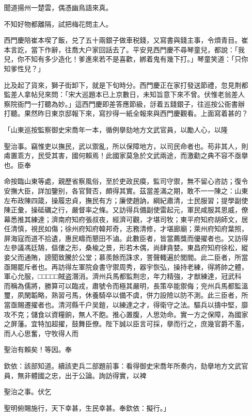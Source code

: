\begin{myquote}
聞道揚州一楚雲，偶憑幽鳥語來真。

不知好物都離隔，試把梅花問主人。
\end{myquote}

西門慶陪崔本喫了飯，兑了五十兩銀子做車税錢，又寫書與錢主事，令煩青目。崔本言訖，當下作辭，往喬大户家回話去了。平安見西門慶不尋琴童兒，都說：「我兒，你不知有多少造化！爹進來若不是喜歡，綁着鬼有幾下打。」琴童笑道：「只你知爹性兒？」

比及起了貨來，獅子街卸下，就是下旬時分。西門慶正在家打發送節禮，忽見荆都監差人拿帖兒來問：「宋大巡題本已上京數日，未知旨意下來不曾。伏惟老翁差人察院衙門一打聽為妙。」這西門慶即差答應節級，㧱着五錢銀子，往巡按公衙書辦打聽。果然昨日東京邸報下來，寫抄得一紙全報來與西門慶觀看。上面寫着甚的？

\begin{myquote}
「山東巡按監察御史宋喬年一本，循例擧劾地方文武官員，以勵人心，以隆

聖治事。竊惟吏以撫民，武以禦亂，所以保障地方，以司民命者也。苟非其人，則䖏置乖方，民受其害，國何賴焉！此國家莫急於文武兩途，而激勸之典不容不亟擧也。臣奉

命按臨山東等處，親歷省察風俗，至於吏政民瘼，監司守禦，無不留心咨訪；復令安撫大臣，詳加鑒别，各官賢否，頗得其實。茲當差滿之期，敢不一一陳之：山東左布政陳四箴，操履忠貞，撫民有方；廉使趙訥，綱紀肅清，士民服習；提學副使陳正彙，操砥礪之行，嚴督率之條。又訪得兵備副使雷起元，軍民咸服其恩威，僚幕悉推其練達；濟南府知府張叔夜，經濟可觀，才堪司牧；東平府知府胡師文，居任清慎，視民如傷；徐州府知府韓邦奇，志務清修，才堪廊廟；萊州府知府葉照，屏海寇而道不拾遺，惠民疇而懇田不滷。此數臣者，皆當薦獎而優擢者也。又訪得左參議馮廷鵠，傴僂之形，桑楡之景，形若木偶，尚肆貪婪。東昌府知府徐松，縱妾父而通賄，謗聞致騰於公堂；慕羨餘而誅求，詈聲輙遍於閭閻。此二臣者，所當亟賜罷斥者也。再訪得左軍院僉書守禦周秀，器宇恢弘，操持老練，得將帥之體，軍心允服，□□□□□賊盗潛消。濟州兵馬都監荆忠，年力精強，才猷練達，冠武科而稱為儒將，勝算可以臨戎，肅號令而極其嚴明，長策卒能禦侮；兖州兵馬都監溫璽，夙閑韜略，熟習弓馬，休養騎卒以備不虞，併力設險以防不測。此三臣者，所當亟賜遷擢者也。清河縣千户吴鎧，以練達之才，得衛守之法。驅兵以擣中堅，靡攻不克；儲食以資糧餉，無人不飽。推心置腹，人思効命。實一方之保障，為國家之屏藩。宜特加超擢，鼓舞臣僚。陛下誠以臣言可採，擧而行之，庶幾官爵不濫，而人心思奮，守牧得人而

聖治有賴矣！等因。奉

欽依：該部知道。續該吏兵二部題前事：看得御史宋喬年所奏内，劾擧地方文武官員，無非體國之忠，出于公論。詢訪得實，以裨

聖治之事。伏乞

聖明俯賜施行，天下幸甚，生民幸甚。奉欽依：擬行。」
\end{myquote}

